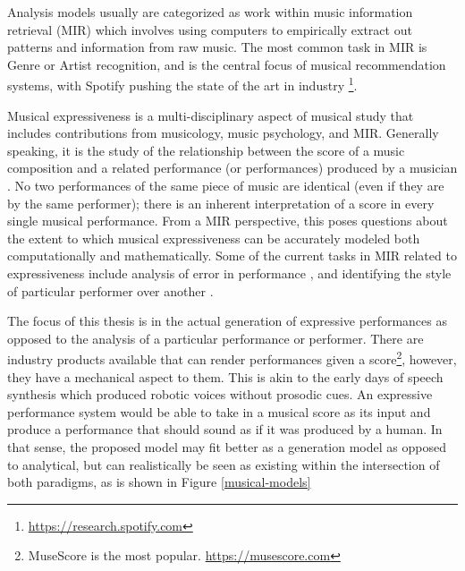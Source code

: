 \documentclass[letterpaper,12pt]{article}
\begin{document}
Analysis models usually are categorized as work within music information retrieval (MIR) \cite{widmer2016getting} which involves using computers to empirically extract out patterns and information from raw music. The most common task in MIR is Genre or Artist recognition, and is the central focus of musical recommendation systems, with Spotify pushing the state of the art in industry \footnote{\url{https://research.spotify.com}}.

Musical expressiveness is a multi-disciplinary aspect of musical study that includes contributions from musicology, music psychology, and MIR. Generally speaking, it is the study of the relationship between the score of a music composition and a related performance (or performances) produced by a musician \cite{cancino2018computational}. No two performances of the same piece of music are identical (even if they are by the same performer); there is an inherent interpretation of a score in every single musical performance. From a MIR perspective, this poses questions about the extent to which musical expressiveness can be accurately modeled both computationally and mathematically. Some of the current tasks in MIR related to expressiveness include analysis of error in performance \cite{flossmann2010magaloff}, and identifying the style of particular performer over another \cite{grachten2012linear}. 

The focus of this thesis is in the actual generation of expressive performances as opposed to the analysis of a particular performance or performer. There are industry products available that can render performances given a score\footnote{MuseScore is the most popular. \url{https://musescore.com}}, however, they have a mechanical aspect to them. This is akin to the early days of speech synthesis which produced robotic voices without prosodic cues. An expressive performance system would be able to take in a musical score as its input and produce a performance that should sound as if it was produced by a human. In that sense, the proposed model may fit better as a generation model as opposed to analytical, but can realistically be seen as existing within the intersection of both paradigms, as is shown in Figure \ref{musical-models}
\end{document}
